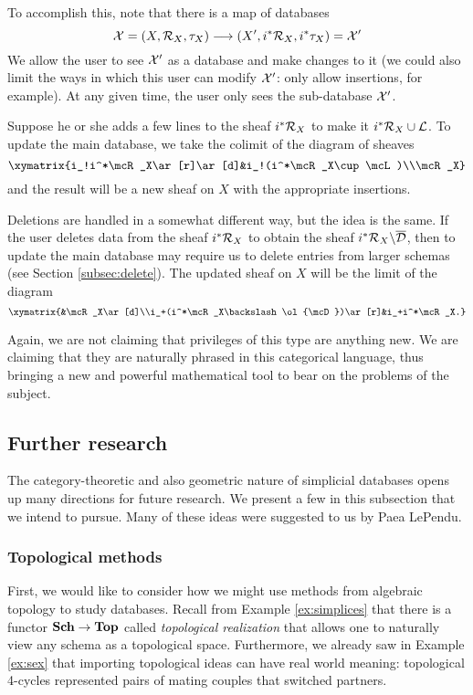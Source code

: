 \documentclass{amsart}
\begin{document}
To accomplish this, note that there is a map of databases $$\mathcal{X}=(X,\mathcal{R}_X,\tau_X)\longrightarrow(X',i^*\mathcal{R}_X,i^*\tau_X)=\mathcal{X}'$$  We allow the user to see $\mathcal{X}'$ as a database and make changes to it (we could also limit the ways in which this user can modify $\mathcal{X}'$: only allow insertions, for example).  At any given time, the user only sees the sub-database $\mathcal{X}'$.  

Suppose he or she adds a few lines to the sheaf $i^*\mathcal{R}_X$ to make it $i^*\mathcal{R}_X\cup\mathcal{L}$.  To update the main database, we take the colimit of the diagram of sheaves $$\xymatrix{i_!i^*\mcR_X\ar[r]\ar[d]&i_!(i^*\mcR_X\cup\mcL)\\\mcR_X}$$ and the result will be a new sheaf on $X$ with the appropriate insertions.  

Deletions are handled in a somewhat different way, but the idea is the same.  If the user deletes data from the sheaf $i^*\mathcal{R}_X$ to obtain the sheaf $i^*\mathcal{R}_X\backslash\overline{\mathcal{D}}$, then to update the main database may require us to delete entries from larger schemas (see Section \ref{subsec:delete}).  The updated sheaf on $X$ will be the limit of the diagram $$\xymatrix{&\mcR_X\ar[d]\\i_+(i^*\mcR_X\backslash\ol{\mcD})\ar[r]&i_+i^*\mcR_X.}$$

Again, we are not claiming that privileges of this type are anything new.  We are claiming that they are naturally phrased in this categorical language, thus bringing a new and powerful mathematical tool to bear on the problems of the subject.

\subsection{Further research}\label{subsec:further research}

The category-theoretic and also geometric nature of simplicial databases opens up many directions for future research.  We present a few in this subsection that we intend to pursue.  Many of these ideas were suggested to us by Paea LePendu.

\subsubsection{Topological methods}\label{subsubsec:top}

First, we would like to consider how we might use methods from algebraic topology to study databases.  Recall from Example \ref{ex:simplices} that there is a functor ${\bf Sch}\rightarrow{\bf Top}$ called {\em topological realization} that allows one to naturally view any schema as a topological space.  Furthermore, we already saw in Example \ref{ex:sex} that importing topological ideas can have real world meaning: topological 4-cycles represented pairs of mating couples that switched partners.  
\end{document}
